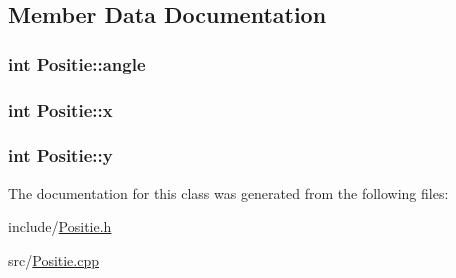 \subsection{Member Data Documentation}
\hypertarget{classPositie_aa052314b6d640497b28f7c002b1ab424}{
\subsubsection[{angle}]{\setlength{\rightskip}{0pt plus 5cm}int Positie\-::angle\hspace{0.3cm}{\ttfamily [private]}}}\label{classPositie_aa052314b6d640497b28f7c002b1ab424}
\hypertarget{classPositie_a008403bc70c73cd5e32922054dd41782}{
\subsubsection[{x}]{\setlength{\rightskip}{0pt plus 5cm}int Positie\-::x\hspace{0.3cm}{\ttfamily [private]}}}\label{classPositie_a008403bc70c73cd5e32922054dd41782}
\hypertarget{classPositie_a8eed2beb3e65dce35802a4b85936f497}{
\subsubsection[{y}]{\setlength{\rightskip}{0pt plus 5cm}int Positie\-::y\hspace{0.3cm}{\ttfamily [private]}}}\label{classPositie_a8eed2beb3e65dce35802a4b85936f497}


The documentation for this class was generated from the following files\-:\begin{DoxyCompactItemize}
\item 
include/\hyperlink{Positie_8h}{Positie.\-h}\item 
src/\hyperlink{Positie_8cpp}{Positie.\-cpp}\end{DoxyCompactItemize}
